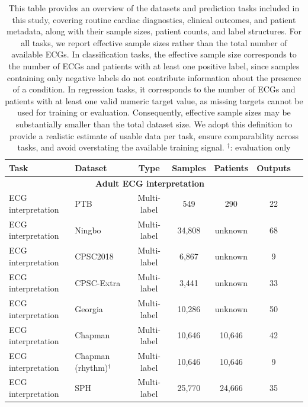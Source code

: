 \documentclass{article}
\begin{document}
        \begin{table}[htbp]
            \centering
            \small
            \caption{This table provides an overview of the datasets and prediction tasks included in this study, covering routine cardiac diagnostics, clinical outcomes, and patient metadata, along with their sample sizes, patient counts, and label structures. For all tasks, we report effective sample sizes rather than the total number of available ECGs. In classification tasks, the effective sample size corresponds to the number of ECGs and patients with at least one positive label, since samples containing only negative labels do not contribute information about the presence of a condition. In regression tasks, it corresponds to the number of ECGs and patients with at least one valid numeric target value, as missing targets cannot be used for training or evaluation. Consequently, effective sample sizes may be substantially smaller than the total dataset size. We adopt this definition to provide a realistic estimate of usable data per task, ensure comparability across tasks, and avoid overstating the available training signal. ${}^\dagger$: evaluation only}
            \setlength{\tabcolsep}{2pt} 
            \begin{tabular}{llccccc}
                \toprule
                \textbf{Task} & \textbf{Dataset}  & \textbf{Type} & \textbf{Samples} & \textbf{Patients} & \textbf{Outputs} \\
                \midrule
                \multicolumn{6}{c}{\textbf{Adult ECG interpretation }} \\
                ECG interpretation &PTB & Multi-label & 549 & 290 & 22 \\
                ECG interpretation & Ningbo &   Multi-label & 34,808 &  unknown &68 \\
                ECG interpretation & CPSC2018 &  Multi-label & 6,867 & unknown &9 \\
                ECG interpretation & CPSC-Extra &   Multi-label & 3,441 & unknown &33 \\
                ECG interpretation & Georgia &   Multi-label & 10,286 & unknown & 50 \\
                ECG interpretation & Chapman & Multi-label & 10,646 & 10,646 & 42 \\
                ECG interpretation & Chapman (rhythm)${}^\dagger$ & Multi-label & 10,646 & 10,646 & 9 \\
                ECG interpretation & SPH & Multi-label& 25,770 & 24,666 & 35 \\

\end{tabular}
\end{table}
\end{document}
